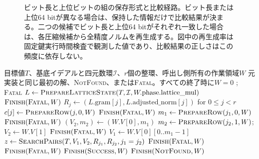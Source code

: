 \documentclass[a4paper,10pt]{ltjsarticle}
\theoremstyle{definition}
\theoremstyle{remark}
\begin{document}
\begin{figure}[H]
  \centering
  
  \caption{ビット長と上位ビットの組の保存形式と比較経路。ビット長または上位64 bitが異なる場合は、保持した情報だけで比較結果が決まる。二つの候補でビット長と上位64 bitがそれぞれ一致した場合は、各圧縮候補から全精度ノルムを再生成する。図中の再生成率は固定鍵実行時間検査で観測した値であり、比較結果の正しさはこの頻度に依存しない。}
  \label{fig:sketch-flow}
\end{figure}

\begin{algorithm}[H]
  \caption{全行を検証してから二行ずつ探索するv2提案実装の\texttt{find\_uv}}
  \label{alg:two-row-schedule}
  \small
  \begin{algorithmic}[1]
    \Require 目標値$T$、基底イデアルと四元数環$\mathcal I$、$r$個の整環、呼出し側所有の作業領域$W$
    \Ensure 元実装と同じ最初の解、\textsc{NotFound}、または\textsc{Fatal}。すべての終了時に$W=0$
        \State {}; \State \Return \textsc{Fatal}
      \EndIf
      \State {}
      \State $L\gets\Call{PrepareLatticeState}{T,\mathcal I,W.\mathrm{phase}.\mathrm{lattice\_mul}}$
       \State \Return $\Call{Finish}{\textsc{Fatal},W}$ \EndIf
      \State $R_j\gets(L.\mathrm{gram}[j],L.\mathrm{adjusted\_norm}[j])$ for $0\leq j<r$
      \State {} 
       
        \State $c[j]\gets\Call{PrepareRow}{j,0,W}$
         \State \Return $\Call{Finish}{\textsc{Fatal},W}$ \EndIf
      \EndFor
        \State $m_1\gets\Call{PrepareRow}{j_1,0,W}$
         \State \Return $\Call{Finish}{\textsc{Fatal},W}$ \EndIf
            \State $(V_2,m_2)\gets(W.V[0],m_1)$ 
          \Else
            \State $m_2\gets\Call{PrepareRow}{j_2,1,W}$; $V_2\gets W.V[1]$
             \State \Return $\Call{Finish}{\textsc{Fatal},W}$ \EndIf
          \EndIf
          \State $V_1\gets W.V[0][0..m_1-1]$
          \State $z\gets\Call{SearchPairs}{T,V_1,V_2,R_{j_1},R_{j_2},j_1=j_2}$
           \State \Return $\Call{Finish}{\textsc{Fatal},W}$ \EndIf
              \State \Return $\Call{Finish}{\textsc{Fatal},W}$
            \EndIf
            \State \Return $\Call{Finish}{\textsc{Success},W}$
          \EndIf
        \EndFor
      \EndFor
      \State \Return $\Call{Finish}{\textsc{NotFound},W}$
    \EndFunction
  \end{algorithmic}
\end{algorithm}
\end{document}
